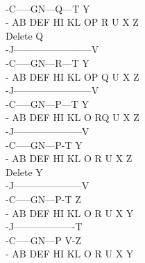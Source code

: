 \documentclass[10pt,twoside,a4paper]{article}
\begin{document}
\begin{itemize}
\\-\hspace{0.5cm}C-----G\hspace{0.8cm}N---Q---T\hspace{0.3cm} Y
\\- AB   DEF  HI         KL   OP   R   U         X   Z
\\Delete Q
\\-\hspace{1cm}J------------------------V
\\-\hspace{0.5cm}C-----G\hspace{0.8cm}N---R---T\hspace{0.3cm} Y
\\- AB   DEF  HI         KL   OP   Q   U         X   Z
\\-\hspace{1cm}J------------------------V
\\-\hspace{0.5cm}C-----G\hspace{0.8cm}N---P---T\hspace{0.3cm} Y
\\- AB   DEF  HI         KL   O   RQ   U         X   Z
\\-\hspace{1cm}J---------------------V
\\-\hspace{0.5cm}C-----G\hspace{0.8cm}N---P-T\hspace{0.3cm} Y
\\- AB   DEF  HI         KL   O   R   U         X   Z
\\Delete Y
\\-\hspace{1cm}J---------------------V
\\-\hspace{0.5cm}C-----G\hspace{0.8cm}N---P-T\hspace{0.3cm} Z
\\- AB   DEF  HI         KL   O   R   U         X   Y
\\-\hspace{1cm}J-------------------T
\\-\hspace{0.5cm}C-----G\hspace{0.8cm}N---P\hspace{0.3cm} V-Z
\\- AB   DEF  HI         KL   O   R   U         X   Y

\end{itemize}
\end{document}
